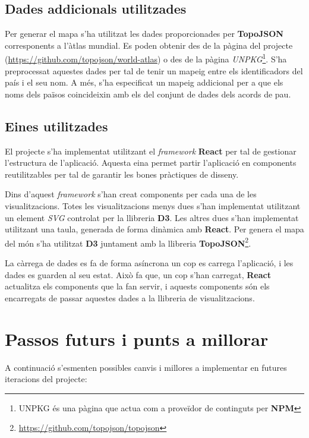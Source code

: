 \documentclass{article}
\begin{document}
\subsection{Dades addicionals utilitzades}
Per generar el mapa s'ha utilitzat les dades proporcionades per \textbf{TopoJSON}
corresponents a l'àtlas mundial. Es poden obtenir des de la pàgina del projecte
(\url{https://github.com/topojson/world-atlas}) o des de la pàgina
\textit{UNPKG}\footnote{UNPKG és una pàgina que actua com a proveïdor de continguts
per \textbf{NPM}}. S'ha preprocessat aquestes dades per tal de tenir un mapeig
entre els identificadors del país i el seu nom. A més, s'ha especificat un mapeig
addicional per a que els noms dels països coincideixin amb els del conjunt de dades
dels acords de pau.

\subsection{Eines utilitzades}
El projecte s'ha implementat utilitzant el \textit{framework} \textbf{React} per
tal de gestionar l'estructura de l'aplicació. Aquesta eina permet partir
l'aplicació en components reutilitzables per tal de garantir les bones pràctiques
de disseny.

Dins d'aquest \textit{framework} s'han creat components per cada una de les
visualitzacions. Totes les visualitzacions menys dues s'han implementat
utilitzant un element \textit{SVG} controlat per la llibreria \textbf{D3}. Les
altres dues s'han implementat utilitzant una taula, generada de forma dinàmica
amb \textbf{React}. Per genera el mapa del món s'ha utilitzat \textbf{D3}
juntament amb la llibreria \textbf{TopoJSON}\footnote{\url{https://github.com/topojson/topojson}}.

La càrrega de dades es fa de forma asíncrona un cop es carrega l'aplicació, i
les dades es guarden al seu estat. Això fa que, un cop s'han carregat,
\textbf{React} actualitza els components que la fan servir, i aquests components
són els encarregats de passar aquestes dades a la llibreria de visualitzacions.


\section{Passos futurs i punts a millorar}
A continuació s'esmenten possibles canvis i millores a implementar en futures
iteracions del projecte:
\end{document}
